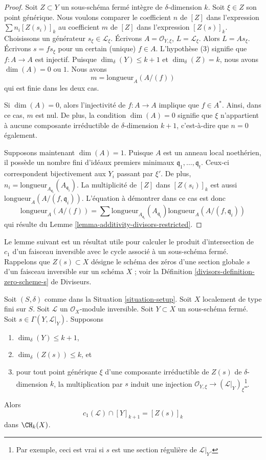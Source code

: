 \begin{proof}
Soit $Z \subset Y$ un sous-schéma fermé intègre de
$\delta$-dimension $k$. Soit $\xi \in Z$ son point générique.
Nous voulons comparer le coefficient $n$ de $[Z]$ dans l'expression
$\sum n_i[Z(s_i)]_k$ au coefficient $m$ de $[Z]$ dans
l'expression $[Z(s)]_k$. Choisissons un générateur $s_\xi \in \mathcal{L}_\xi$.
Écrivons $A = \mathcal{O}_{Y, \xi}$, $L = \mathcal{L}_\xi$.
Alors $L = As_\xi$. Écrivons $s = f s_\xi$ pour un certain (unique) $f \in A$.
L'hypothèse (3) signifie que $f : A \to A$ est injectif.
Puisque $\dim_\delta(Y) \leq k + 1$ et $\dim_\delta(Z) = k$,
nous avons $\dim(A) = 0$ ou $1$. Nous avons
$$
m = \text{longueur}_A(A/(f))
$$
qui est finie dans les deux cas.

\medskip\noindent
Si $\dim(A) = 0$, alors l'injectivité de $f : A \to A$
implique que $f \in A^*$. Ainsi, dans ce cas, $m$ est nul.
De plus, la condition $\dim(A) = 0$ signifie que $\xi$
n'appartient à aucune composante irréductible de $\delta$-dimension
$k + 1$, c'est-à-dire que $n = 0$ également.

\medskip\noindent
Supposons maintenant $\dim(A) = 1$.
Puisque $A$ est un anneau local noethérien, il possède un nombre fini
d'idéaux premiers minimaux $\mathfrak q_1, \ldots, \mathfrak q_t$.
Ceux-ci correspondent bijectivement aux $Y_i$ passant par $\xi'$.
De plus, $n_i = \text{longueur}_{A_{\mathfrak q_i}}(A_{\mathfrak q_i})$.
La multiplicité de $[Z]$ dans $[Z(s_i)]_k$ est aussi
$\text{longueur}_A(A/(f, \mathfrak q_i))$.
L'équation à démontrer dans ce cas est donc
$$
\text{longueur}_A(A/(f))
=
\sum \text{longueur}_{A_{\mathfrak q_i}}(A_{\mathfrak q_i})
\text{longueur}_A(A/(f, \mathfrak q_i))
$$
qui résulte du
Lemme \ref{lemma-additivity-divisors-restricted}.
\end{proof}

\noindent
Le lemme suivant est un résultat utile pour calculer le produit d'intersection
de $c_1$ d'un faisceau inversible avec le cycle associé
à un sous-schéma fermé.
Rappelons que $Z(s) \subset X$ désigne le schéma des zéros d'une section globale
$s$ d'un faisceau inversible sur un schéma $X$ ; voir la
Définition \ref{divisors-definition-zero-scheme-s} de Diviseurs.

\begin{lemma}
\label{lemma-geometric-cap}
Soit $(S, \delta)$ comme dans la Situation \ref{situation-setup}.
Soit $X$ localement de type fini sur $S$.
Soit $\mathcal{L}$ un $\mathcal{O}_X$-module inversible.
Soit $Y \subset X$ un sous-schéma fermé.
Soit $s \in \Gamma(Y, \mathcal{L}|_Y)$.
Supposons
\begin{enumerate}
\item $\dim_\delta(Y) \leq k + 1$,
\item $\dim_\delta(Z(s)) \leq k$, et
\item pour tout point générique $\xi$ d'une composante irréductible de
$Z(s)$ de $\delta$-dimension $k$, la multiplication par $s$
induit une injection
$\mathcal{O}_{Y, \xi} \to (\mathcal{L}|_Y)_\xi$\footnote{Par exemple,
ceci est vrai si $s$ est une section régulière de $\mathcal{L}|_Y$.}.
\end{enumerate}
Alors
$$
c_1(\mathcal{L}) \cap [Y]_{k + 1} = [Z(s)]_k
$$
dans $\CH_k(X)$.
\end{lemma}


